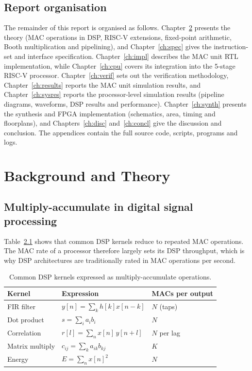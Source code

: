 \documentclass[11pt,a4paper]{report}
\begin{document}
\section{Report organisation}
The remainder of this report is organised as follows. Chapter~\ref{ch:theory}
presents the theory (MAC operations in DSP, RISC-V extensions, fixed-point
arithmetic, Booth multiplication and pipelining), and Chapter~\ref{ch:spec}
gives the instruction-set and interface specification. Chapter~\ref{ch:impl}
describes the MAC unit RTL implementation, while Chapter~\ref{ch:cpu} covers
its integration into the 5-stage RISC-V processor. Chapter~\ref{ch:verif} sets
out the verification methodology, Chapter~\ref{ch:results} reports the MAC unit
simulation results, and Chapter~\ref{ch:sysres} reports the processor-level
simulation results (pipeline diagrams, waveforms, DSP results and performance).
Chapter~\ref{ch:synth} presents the synthesis and FPGA implementation
(schematics, area, timing and floorplans), and Chapters~\ref{ch:disc}
and~\ref{ch:concl} give the discussion and conclusion. The appendices contain
the full source code, scripts, programs and logs.

\chapter{Background and Theory}\label{ch:theory}

\section{Multiply-accumulate in digital signal processing}
Table~\ref{tab:kernels} shows that common DSP kernels reduce to repeated MAC
operations. The MAC rate of a processor therefore largely sets its DSP
throughput, which is why DSP architectures are traditionally rated in
MAC operations per second.

\begin{table}[H]
  \centering
  \caption{Common DSP kernels expressed as multiply-accumulate operations.}
  \label{tab:kernels}
  \begin{tabular}{@{}lll@{}}
    \toprule
    Kernel & Expression & MACs per output \\
    \midrule
    FIR filter      & $y[n]=\sum_k h[k]x[n-k]$            & $N$ (taps) \\
    Dot product     & $s=\sum_i a_i b_i$                  & $N$ \\
    Correlation     & $r[l]=\sum_n x[n]\,y[n+l]$          & $N$ per lag \\
    Matrix multiply & $c_{ij}=\sum_k a_{ik}b_{kj}$        & $K$ \\
    Energy          & $E=\sum_n x[n]^2$                   & $N$ \\
    \bottomrule
  \end{tabular}
\end{table}
\end{document}
